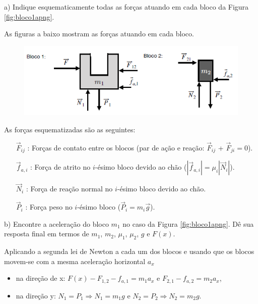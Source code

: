 \begin{enumerate}[start=1,label={\bfseries Q\arabic*.}]
a) Indique esquematicamente todas as forças atuando em cada bloco da Figura \ref{fig:bloco1apng}.

\resposta

As figuras a baixo mostram as forças atuando em cada bloco.

\begin{figure}[H]
\centering
\includegraphics[scale=0.7]{classica-img/bloco1.png}
\end{figure}

As forças esquematizadas são as seguintes:

\begin{itemize}
\item[$\vec{F}_{ij}$]: Forças de contato entre os blocos (par de ação e reação: $\vec{F}_{ij}$ + $\vec{F}_{ji} = 0$).
\item[$\vec{f}_{a,i}$]: Força de atrito no $i$-ésimo bloco devido ao chão ($|\vec{f}_{a,i}| = \mu_{i} |\vec{N}_{i}|$).
\item[$\vec{N}_{i}$]: Força de reação normal no $i$-ésimo bloco devido ao chão.
\item[$\vec{P}_{i}$]: Força peso no $i$-ésimo bloco ($\vec{P}_{i} = m_{i}\vec{g}$).
\end{itemize}



b) Encontre a aceleração do bloco $m_{1}$ no caso da Figura \ref{fig:bloco1apng}. Dê sua resposta final em termos de $m_{1}$, $m_{2}$, $\mu_{1}$, $\mu_{2}$, $g$ e $F(x)$.

\resposta

Aplicando a segunda lei de Newton a cada um dos blocos e usando que os blocos movem-se com a mesma aceleração horizontal $a_{x}$

\begin{itemize}
\item na direção de x: $F(x) - F_{1,2} - f_{a,1} = m_{1}a_{x}$ \quad e \quad $F_{2,1} - f_{a,2} = m_{2}a_{x}$,

\item na direção y: $N_{1} = P_{1} \Rightarrow N_{1} = m_{1}g $ \quad e \quad $N_{2} = P_{2} \Rightarrow N_{2} = m_{2}g $.


\end{itemize}
\end{enumerate}
